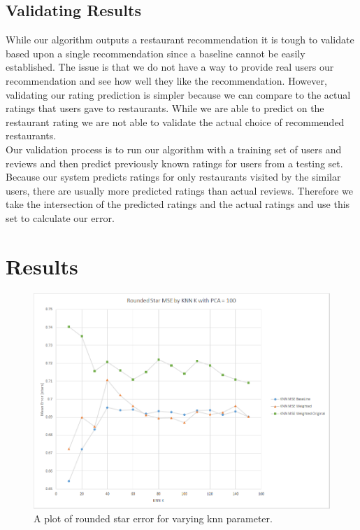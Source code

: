 \documentclass[10pt,twocolumn,letterpaper]{article}
\begin{document}
\subsection{Validating Results}
While our algorithm outputs a restaurant recommendation it is tough to validate based upon a single recommendation since a baseline cannot be easily established. The issue is that we do not have a way to provide real users our recommendation and see how well they like the recommendation. However, validating our rating prediction is simpler because we can compare to the actual ratings that users gave to restaurants. While we are able to predict on the restaurant rating we are not able to validate the actual choice of recommended restaurants.
\\[0.5em]
\indent Our validation process is to run our algorithm with a training set of users and reviews and then predict previously known ratings for users from a testing set. Because our system predicts ratings for only restaurants visited by the similar users, there are usually more predicted ratings than actual reviews. Therefore we take the intersection of the predicted ratings and the actual ratings and use this set to calculate our error.


\section{Results}

\begin{figure}[t]
\begin{center}
   \includegraphics[width=0.9\linewidth]{knnErr.png}
\end{center}
   \caption{A plot of rounded star error for varying knn parameter.}
\label{fig:knnErr}
\end{figure}
\end{document}
